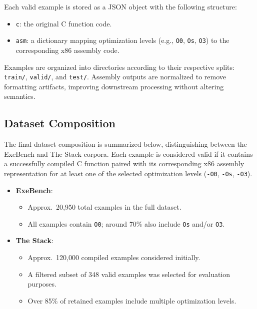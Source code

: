 \documentclass[../main.tex]{subfiles}
\begin{document}
Each valid example is stored as a JSON object with the following structure:

\begin{itemize}
    \item \texttt{c}: the original C function code.
    \item \texttt{asm}: a dictionary mapping optimization levels (e.g., \texttt{O0}, \texttt{Os}, \texttt{O3}) to the corresponding x86 assembly code.
\end{itemize}

Examples are organized into directories according to their respective splits: \texttt{train/}, \texttt{valid/}, and \texttt{test/}. Assembly outputs are normalized to remove formatting artifacts, improving downstream processing without altering semantics.

\subsection{Dataset Composition}

The final dataset composition is summarized below, distinguishing between the ExeBench and The Stack corpora. Each example is considered valid if it contains a successfully compiled C function paired with its corresponding x86 assembly representation for at least one of the selected optimization levels (\texttt{-O0}, \texttt{-Os}, \texttt{-O3}).

\begin{itemize}
    \item \textbf{ExeBench}:
    \begin{itemize}
        \item Approx.\ 20,950 total examples in the full dataset.
        \item All examples contain \texttt{O0}; around 70\% also include \texttt{Os} and/or \texttt{O3}.
    \end{itemize}
    \item \textbf{The Stack}:
    \begin{itemize}
        \item Approx.\ 120,000 compiled examples considered initially.
        \item A filtered subset of 348 valid examples was selected for evaluation purposes.
        \item Over 85\% of retained examples include multiple optimization levels.
    \end{itemize}
\end{itemize}
\end{document}
